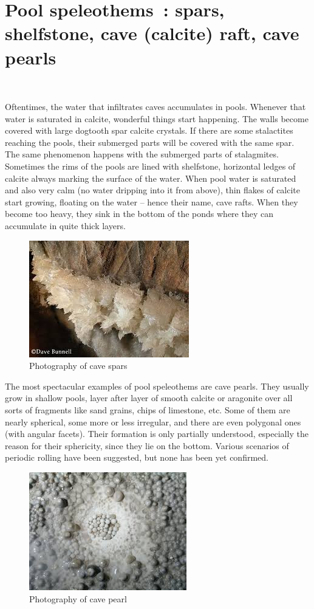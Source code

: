 \documentclass[draft, final]{report}
\begin{document}
\chapter{Pool speleothems : spars, shelfstone, cave (calcite) raft, cave pearls}
~\par
Oftentimes, the water that infiltrates caves accumulates in pools. Whenever that water is saturated  in calcite, wonderful things start happening. The walls become covered with large dogtooth spar calcite crystals. If there are some stalactites reaching the pools, their submerged parts will be covered with the same spar. The same phenomenon happens with the submerged parts of stalagmites. Sometimes the rims of the pools are lined with shelfstone, horizontal ledges of calcite always marking the surface of the water. When pool water is saturated and also very calm (no water dripping into it from above), thin flakes of calcite start growing, floating on the water – hence their name, cave rafts. When they become too heavy, they sink in the bottom of the ponds where they can accumulate in quite thick layers.\\
\begin{figure}[!ht]
  \centering
  \includegraphics[scale=1]{LateX/Images/spars.jpg}
  \caption{Photography of cave spars\cite{cavespars}}
\end{figure}
\clearpage
The most spectacular examples of pool speleothems are cave pearls. They usually grow in shallow pools, layer after layer of smooth calcite or aragonite over all sorts of fragments like sand grains, chips of limestone, etc. Some of them are nearly spherical, some more or less irregular, and there are even polygonal ones (with angular facets). Their formation is only partially understood, especially the reason for their sphericity, since they lie on the bottom. Various scenarios of periodic rolling have been suggested, but none has been yet confirmed.\\
\begin{figure}[!ht]
  \centering
  \includegraphics[scale=1]{LateX/Images/pearl.jpg}
  \caption{Photography of cave pearl\cite{cavepearl}}
\end{figure}
\end{document}
